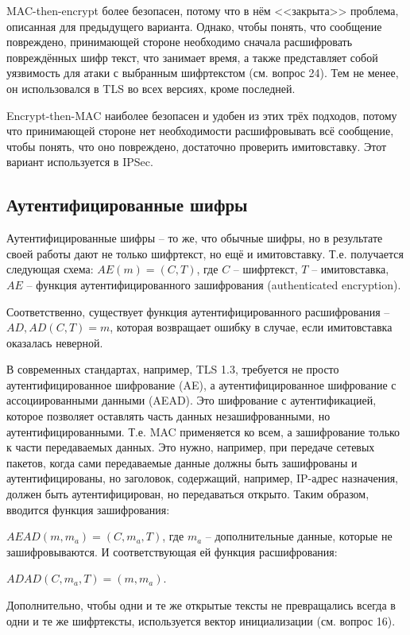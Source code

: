 MAC-then-encrypt более безопасен, потому что в нём <<закрыта>> проблема, описанная для предыдущего варианта. Однако, чтобы понять, что сообщение повреждено, принимающей стороне необходимо сначала расшифровать повреждённых шифр текст, что занимает время, а также представляет собой уязвимость для атаки с выбранным шифртекстом (см. вопрос 24). Тем не менее, он использовался в TLS во всех версиях, кроме последней.

Encrypt-then-MAC наиболее безопасен и удобен из этих трёх подходов, потому что принимающей стороне нет необходимости расшифровывать всё сообщение, чтобы понять, что оно повреждено, достаточно проверить имитовставку. Этот вариант используется в IPSec. 

\subsection{Аутентифицированные шифры}

Аутентифицированные шифры -- то же, что обычные шифры, но в результате своей работы дают не только шифртекст, но ещё и имитовставку. Т.е. получается следующая схема: $AE(m) = (C, T)$, где $C$ -- шифртекст, $T$ -- имитовставка, $AE$ -- функция аутентифицированного зашифрования (authenticated encryption).

Соответственно, существует функция аутентифицированного расшифрования -- $AD, AD(C, T) = m$, которая возвращает ошибку в случае, если имитовставка оказалась неверной.

В современных стандартах, например, TLS 1.3, требуется не просто аутентифицированное шифрование (AE), а аутентифицированное шифрование с ассоциированными данными (AEAD). Это шифрование с аутентификацией, которое позволяет оставлять часть данных незашифрованными, но аутентифицированными. Т.е. MAC применяется ко всем, а зашифрование только к части передаваемых данных. Это нужно, например, при передаче сетевых пакетов, когда сами передаваемые данные должны быть зашифрованы и аутентифицированы, но заголовок, содержащий, например, IP-адрес назначения, должен быть аутентифицирован, но передаваться открыто. Таким образом, вводится функция зашифрования:

$AEAD(m, m_a) = (C, m_a, T)$, где $m_a$ -- дополнительные данные, которые не зашифровываются. И соответствующая ей функция расшифрования:

$ADAD(C, m_a, T) = (m, m_a)$.

Дополнительно, чтобы одни и те же открытые тексты не превращались всегда в одни и те же шифртексты, используется вектор инициализации (см. вопрос 16).

